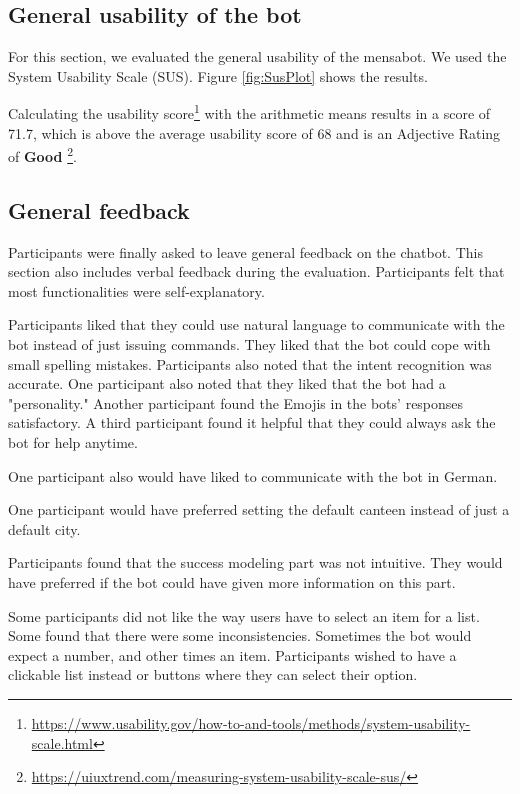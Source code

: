 \subsection{General usability of the bot}
For this section, we evaluated the general usability of the mensabot. We used the System Usability Scale (SUS). Figure \ref{fig:SusPlot} shows the results.

Calculating the usability score\footnote{\label{note1}\url{https://www.usability.gov/how-to-and-tools/methods/system-usability-scale.html}} with the arithmetic means results in a score of 71.7, which is above the average usability score of 68 and is an Adjective Rating of \textbf{Good} \footnote{\url{https://uiuxtrend.com/measuring-system-usability-scale-sus/}}.

\subsection{General feedback}
Participants were finally asked to leave general feedback on the chatbot. This section also includes verbal feedback during the evaluation. 
Participants felt that most functionalities were self-explanatory. 

Participants liked that they could use natural language to communicate with the bot instead of just issuing commands.
They liked that the bot could cope with small spelling mistakes.
Participants also noted that the intent recognition was accurate.
One participant also noted that they liked that the bot had a "personality." Another participant found the Emojis in the bots' responses satisfactory. A third participant found it helpful that they could always ask the bot for help anytime.

One participant also would have liked to communicate with the bot in German.

One participant would have preferred setting the default canteen instead of just a default city. 

Participants found that the success modeling part was not intuitive. They would have preferred if the bot could have given more information on this part. 

Some participants did not like the way users have to select an item for a list. Some found that there were some inconsistencies. Sometimes the bot would expect a number, and other times an item. 
Participants wished to have a clickable list instead or buttons where they can select their option.

